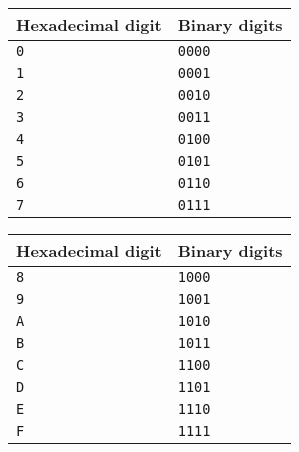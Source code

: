 \documentclass[a4paper,12pt]{article}
\newcommand{\num}[1]{\texttt{#1}}
\begin{document}
\begin{center}
  \begin{tabular}{@{}ll@{}}
    Hexadecimal digit & Binary digits \\
    \hline
    \num{0}           & \num{0000}   \\
    \num{1}           & \num{0001}   \\
    \num{2}           & \num{0010}   \\
    \num{3}           & \num{0011}   \\
    \num{4}           & \num{0100}   \\
    \num{5}           & \num{0101}   \\
    \num{6}           & \num{0110}   \\
    \num{7}           & \num{0111}   \\
    \hline
  \end{tabular}
  \hfil
  \begin{tabular}{@{}ll@{}}
    Hexadecimal digit & Binary digits \\
    \hline
    \num{8}           & \num{1000}   \\
    \num{9}           & \num{1001}   \\
    \num{A}           & \num{1010}   \\
    \num{B}           & \num{1011}   \\
    \num{C}           & \num{1100}   \\
    \num{D}           & \num{1101}   \\
    \num{E}           & \num{1110}   \\
    \num{F}           & \num{1111}   \\
    \hline
  \end{tabular}
\end{center}
\end{document}
